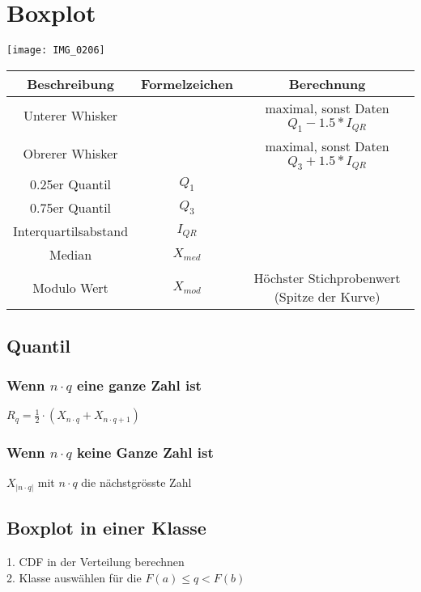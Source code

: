 \documentclass[../STS.tex]{subfiles}
\begin{document}
\section{Boxplot}

\texttt{[image: IMG\_0206]}
	

\begin{tabular}{|c c c|}

\hline
Beschreibung & Formelzeichen & Berechnung \\

\hline

	Unterer Whisker &
	&
	maximal, sonst Daten
	$
	Q_1 - 1.5 * I_{QR}
	$ \\
	\hline
	
	Obrerer Whisker &
	&
	maximal, sonst Daten
	$
	Q_3 + 1.5 * I_{QR}
	$
	\\
	\hline
	
	0.25er Quantil &
	$ Q_1 $ &
	\\
	\hline
	
	0.75er Quantil &
	$ Q_3 $ &
	\\
	\hline
	
	Interquartilsabstand &
	$ I_{QR} $ &
	\\
	\hline
	
	Median &
	$ X_{med} $ &
	\\
	\hline
	
	Modulo Wert &
	$ X_{mod} $ &
	Höchster Stichprobenwert (Spitze der Kurve)
	\\
	\hline
	
\end{tabular}
	

	\subsection{Quantil}

	
	\subsubsection{Wenn $n \cdot q $ eine ganze Zahl ist}
	$
	R_q
	=
	\frac{1}{2}
	\cdot
	(
		X_{n \cdot q} +
		X_{n \cdot q+1}
	)
	$

\subsubsection{Wenn $n \cdot q $ keine Ganze Zahl ist}
	$
	X_{| n \cdot q |}
	$
	mit $ n \cdot q $ die n\"achstgrösste Zahl
	
\subsection{Boxplot in einer Klasse}
1. CDF in der Verteilung berechnen \\
2. Klasse auswählen für die $ F(a) \leq q < F(b) $
\end{document}
